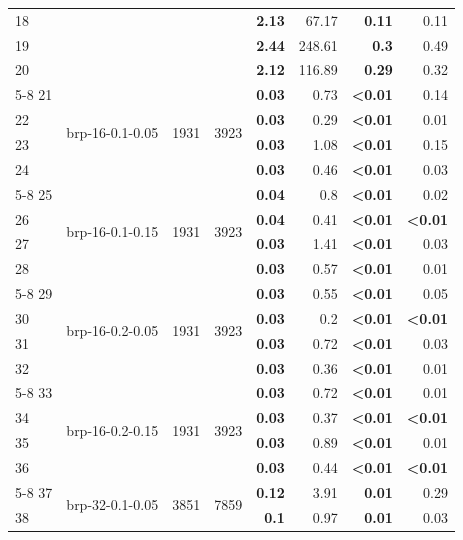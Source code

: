 \begin{longtable}{lrr@{\hskip 12pt}r@{\hskip 12pt}r@{\hskip 12pt}r@{\hskip 12pt}r@{\hskip 12pt}r}
18 &  &  &  & \textbf{2.13} & 67.17 & \textbf{0.11} & 0.11 \\
19 &  &  &  & \textbf{2.44} & 248.61 & \textbf{0.3} & 0.49 \\
20 &  &  &  & \textbf{2.12} & 116.89 & \textbf{0.29} & 0.32 \\
\cmidrule{5-8}
21 & \multirow{4}{*}{brp-16-0.1-0.05} & \multirow{4}{*}{1931} & \multirow{4}{*}{3923} & \textbf{0.03} & 0.73 & \textbf{<0.01} & 0.14 \\
22 &  &  &  & \textbf{0.03} & 0.29 & \textbf{<0.01} & 0.01 \\
23 &  &  &  & \textbf{0.03} & 1.08 & \textbf{<0.01} & 0.15 \\
24 &  &  &  & \textbf{0.03} & 0.46 & \textbf{<0.01} & 0.03 \\
\cmidrule{5-8}
25 & \multirow{4}{*}{brp-16-0.1-0.15} & \multirow{4}{*}{1931} & \multirow{4}{*}{3923} & \textbf{0.04} & 0.8 & \textbf{<0.01} & 0.02 \\
26 &  &  &  & \textbf{0.04} & 0.41 & \textbf{<0.01} & \textbf{<0.01} \\
27 &  &  &  & \textbf{0.03} & 1.41 & \textbf{<0.01} & 0.03 \\
28 &  &  &  & \textbf{0.03} & 0.57 & \textbf{<0.01} & 0.01 \\
\cmidrule{5-8}
29 & \multirow{4}{*}{brp-16-0.2-0.05} & \multirow{4}{*}{1931} & \multirow{4}{*}{3923} & \textbf{0.03} & 0.55 & \textbf{<0.01} & 0.05 \\
30 &  &  &  & \textbf{0.03} & 0.2 & \textbf{<0.01} & \textbf{<0.01} \\
31 &  &  &  & \textbf{0.03} & 0.72 & \textbf{<0.01} & 0.03 \\
32 &  &  &  & \textbf{0.03} & 0.36 & \textbf{<0.01} & 0.01 \\
\cmidrule{5-8}
33 & \multirow{4}{*}{brp-16-0.2-0.15} & \multirow{4}{*}{1931} & \multirow{4}{*}{3923} & \textbf{0.03} & 0.72 & \textbf{<0.01} & 0.01 \\
34 &  &  &  & \textbf{0.03} & 0.37 & \textbf{<0.01} & \textbf{<0.01} \\
35 &  &  &  & \textbf{0.03} & 0.89 & \textbf{<0.01} & 0.01 \\
36 &  &  &  & \textbf{0.03} & 0.44 & \textbf{<0.01} & \textbf{<0.01} \\
\cmidrule{5-8}
37 & \multirow{4}{*}{brp-32-0.1-0.05} & \multirow{4}{*}{3851} & \multirow{4}{*}{7859} & \textbf{0.12} & 3.91 & \textbf{0.01} & 0.29 \\
38 &  &  &  & \textbf{0.1} & 0.97 & \textbf{0.01} & 0.03 \\

\end{longtable}
